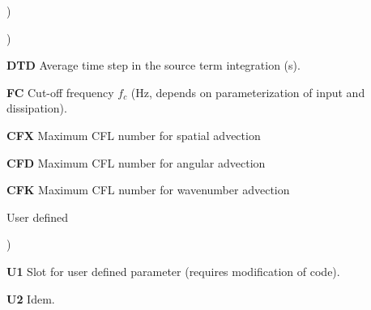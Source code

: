 \begin{list}{)\hfill}
\begin{list}{)\hfill}
            { \leftmargin 8mm 
             \rightmargin 0mm \itemsep 0mm \parsep 0mm}
\item \textbf{DTD} Average time step in the source term integration (s).
\item \textbf{FC} Cut-off frequency $f_c$ (Hz, depends on parameterization of
      input and dissipation).
\item \textbf{CFX} Maximum CFL number for spatial advection 
\item \textbf{CFD} Maximum CFL number for angular advection 
\item \textbf{CFK} Maximum CFL number for wavenumber advection 
\end{list}

\item{User defined }

\begin{list}{)\hfill}
            { \leftmargin 8mm 
             \rightmargin 0mm \itemsep 0mm \parsep 0mm}

\item \textbf{U1} Slot for user defined parameter (requires modification of code).
\item \textbf{U2} Idem.
\end{list}

\end{list}





